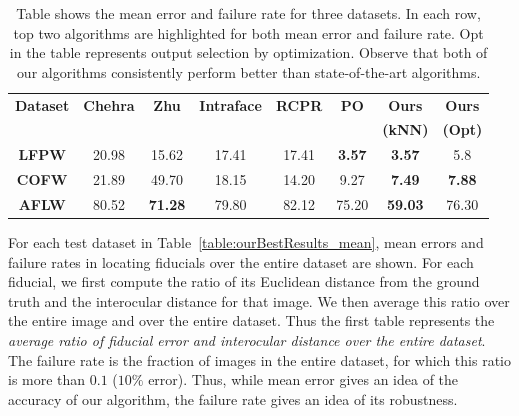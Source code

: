 \begin{table}%
   \centering
   \begin{tabular}{c c c c c c c c}
    \toprule[1.5pt]
     {\bf Dataset} & {\bf Chehra} & {\bf Zhu} & {\bf Intraface} & {\bf RCPR} & {\bf PO} & {\bf Ours} & {\bf Ours }\\
     & & & & & & \bf(kNN) & \bf(Opt) \\%
    \midrule
    {\bf LFPW} &  20.98 & 15.62 & 17.41 & 17.41 & {\bf 3.57} &{\bf 3.57} & 5.8 \\ 
    {\bf COFW} &  21.89 & 49.70 & 18.15 & 14.20 & 9.27 &{\bf 7.49 } & {\bf 7.88} \\
    {\bf AFLW} &  80.52 & {\bf 71.28} & 79.80 & 82.12 & 75.20 & {\bf 59.03} & 76.30  \\ 
    \bottomrule[1.5pt]

    \end{tabular}
    \caption{Table shows the mean error and failure rate for three datasets. In each row, top two algorithms are highlighted for both mean error and failure rate. Opt in the table represents output selection by optimization. Observe that both of our algorithms consistently perform better than state-of-the-art algorithms. }
    \label{table:ourBestResults_fail}
\end{table}

For each test dataset in Table~\ref{table:ourBestResults_mean}, 
mean errors and failure rates in locating fiducials over the entire dataset are shown. For each fiducial, we first compute
the ratio of its Euclidean distance from the ground truth and the interocular distance for that
image. We then average this ratio over the entire image and over the entire dataset. Thus the first
table represents the \emph{average ratio of fiducial error and interocular distance over the entire
dataset}. The failure rate is the
fraction of images in the entire dataset, for which this ratio is more than $0.1$ 
($10 \%$ error). Thus, while mean error gives an idea of the accuracy of our algorithm, the
failure rate gives an idea of its robustness. 
 
